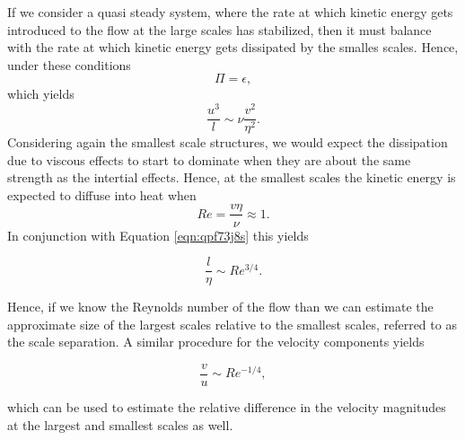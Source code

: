 If we consider a quasi steady system, where the rate at which kinetic energy gets introduced to the flow at the large scales has stabilized, then it must balance with the rate at which kinetic energy gets dissipated by the smalles scales. Hence, under these conditions
\begin{equation}
	\Pi = \epsilon,
\end{equation}
which yields
\begin{equation}
	\label{eqn:qpf73j8s}
	\frac{u^3}{l} \sim \nu \frac{v^2}{\eta^2}.
\end{equation}
Considering again the smallest scale structures, we would expect the dissipation due to viscous effects to start to dominate when they are about the same strength as the intertial effects. Hence, at the smallest scales the kinetic energy is expected to diffuse into heat when
\begin{equation}
	Re = \frac{v \eta}{\nu} \approx 1.
\end{equation}
In conjunction with Equation \ref{eqn:qpf73j8s} this yields
\begin{eqBox}
\begin{equation}
	\frac{l}{\eta} \sim Re^{3/4}.
\end{equation}
\end{eqBox}
Hence, if we know the Reynolds number of the flow than we can estimate the approximate size of the largest scales relative to the smallest scales, referred to as the scale separation. A similar procedure for the velocity components yields
\begin{eqBox}
\begin{equation}
	\frac{v}{u} \sim Re^{-1/4},
\end{equation}
\end{eqBox}
which can be used to estimate the relative difference in the velocity magnitudes at the largest and smallest scales as well.

